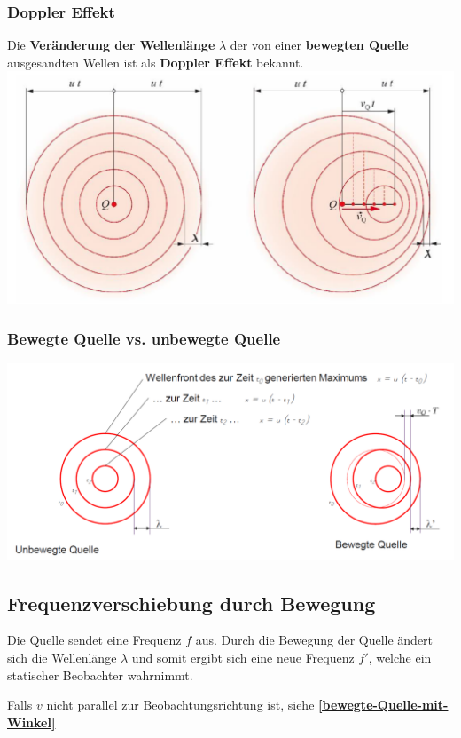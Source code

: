 \subsubsection{Doppler Effekt}
	Die \textbf{Veränderung der Wellenlänge} $\lambda$ der von einer \textbf{bewegten Quelle} ausgesandten Wellen ist als \textbf{Doppler Effekt} bekannt.  \\

	\includegraphics[width=0.8\linewidth]{Bilder/Wellen-Optik/Doppler_effekt}

\subsubsection{Bewegte Quelle vs. unbewegte Quelle}

	\includegraphics[width=0.98\linewidth]{Bilder/Wellen-Optik/Unbewegte_Quelle}

\subsection{Frequenzverschiebung durch Bewegung}

	Die Quelle sendet eine Frequenz $f$ aus. Durch die Bewegung der Quelle ändert sich die Wellenlänge $\lambda$ und somit ergibt sich eine neue Frequenz $f'$, welche ein statischer Beobachter wahrnimmt. 

	Falls $v$ nicht parallel zur Beobachtungsrichtung ist, siehe \textbf{\ref{bewegte-Quelle-mit-Winkel}}

